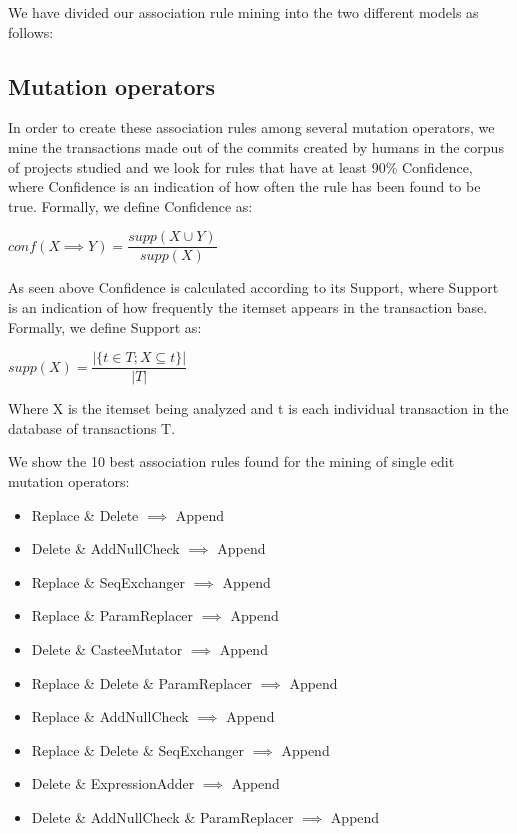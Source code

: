 \documentclass[conference]{IEEEtran}
\begin{document}
We have divided our association rule mining into the two different models as follows:

\subsection{Mutation operators}

In order to create these association rules among several mutation operators, we mine the transactions made out of the commits created by humans in the corpus of projects studied and we look for rules that have at least 90\% Confidence, where Confidence is an indication of how often the rule has been found to be true. 
Formally, we define Confidence as:

\begin{center}
$conf(X \implies Y) = \dfrac{supp(X \cup Y)}{supp(X)}$ 
\end{center}

As seen above Confidence is calculated according to its Support, where Support is an indication of how frequently the itemset appears in the transaction base.
Formally, we define Support as:

\begin{center}
$supp(X) = \dfrac{|\{t \in T; X \subseteq t\}|}{|T|}$
\end{center}

Where X is the itemset being analyzed and t is each individual transaction in the database of transactions T. 

We show the 10 best association rules found for the mining of single edit mutation operators:

\begin{itemize}
\item Replace \& Delete $\implies$ Append
\item Delete \& AddNullCheck $\implies$ Append
\item Replace \& SeqExchanger $\implies$ Append
\item Replace \& ParamReplacer $\implies$ Append
\item Delete \& CasteeMutator $\implies$ Append
\item Replace \& Delete \& ParamReplacer $\implies$ Append
\item Replace \& AddNullCheck $\implies$ Append
\item Replace \& Delete \& SeqExchanger $\implies$ Append
\item Delete \& ExpressionAdder $\implies$ Append
\item Delete \& AddNullCheck \& ParamReplacer $\implies$ Append
\end{itemize}
\end{document}
